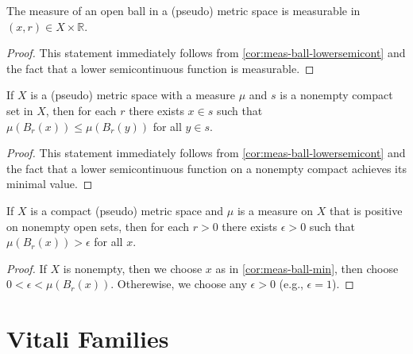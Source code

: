 \begin{corollary}%
  \label{cor:meas-ball-mesaurable}
  \leanok%
  The measure of an open ball in a (pseudo) metric space is measurable in \((x, r)\in X\times\mathbb R\).
\end{corollary}

\begin{proof}
  \leanok%
  This statement immediately follows from \autoref{cor:meas-ball-lowersemicont}
  and the fact that a lower semicontinuous function is measurable.
\end{proof}

\begin{corollary}%
  \label{cor:meas-ball-min}
  \leanok%
  If \(X\) is a (pseudo) metric space with a measure \(\mu\)
  and \(s\) is a nonempty compact set in \(X\),
  then for each \(r\) there exists \(x \in s\) such that \(\mu(B_{r}(x)) \le \mu(B_{r}(y))\) for all \(y \in s\).
\end{corollary}

\begin{proof}
  \leanok%
  This statement immediately follows from \autoref{cor:meas-ball-lowersemicont}
  and the fact that a lower semicontinuous function on a nonempty compact
  achieves its minimal value.
\end{proof}

\begin{corollary}%
  \label{cor:meas-ball-gt-pos}
  \leanok%
  If \(X\) is a compact (pseudo) metric space
  and \(\mu\) is a measure on \(X\) that is positive on nonempty open sets,
  then for each \(r > 0\) there exists \(\epsilon>0\)
  such that \(\mu(B_{r}(x))>\epsilon\) for all \(x\).
\end{corollary}

\begin{proof}
  \leanok%
  If \(X\) is nonempty, then we choose \(x\) as in \autoref{cor:meas-ball-min},
  then choose \(0 < \epsilon < \mu(B_{r}(x))\).
  Otherewise, we choose any \(\epsilon > 0\) (e.g., \(\epsilon = 1\)).
\end{proof}


\section{Vitali Families}%
\label{sec:vitali-families}

